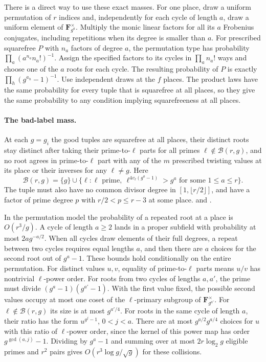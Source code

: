 There is a direct way to use these exact masses. For one place,
draw a uniform permutation of \(r\) indices and, independently for
each cycle of length \(a\), draw a uniform element of
\(\mathbf F_{g^a}^{\times}\). Multiply the monic linear factors for
all its \(a\) Frobenius conjugates, including repetitions when its
degree is smaller than \(a\). For prescribed squarefree \(P\) with
\(n_a\) factors of degree \(a\), the permutation type has probability
\(\prod_a (a^{n_a}n_a!)^{-1}\). Assign the specified factors to its
cycles in \(\prod_a n_a!\) ways and choose one of the \(a\) roots for
each cycle. The resulting probability of \(P\) is exactly
\(\prod_h(g^{a_h}-1)^{-1}\). Use independent draws at the \(f\) places.
The product laws have the same probability for every tuple that is
squarefree at all places, so they give the same probability to any
condition implying squarefreeness at all places.

\paragraph{The bad-label mass.}
At each \(g=g_i\) the good tuples are squarefree at all places,
their distinct roots stay distinct after taking their prime-to-\(\ell\)
parts for all primes \(\ell\notin\mathcal B(r,g)\), and no root
agrees in prime-to-\(\ell\) part with any of the \(m\) prescribed
twisting values at its place or their inverses for any \(\ell\ne g\).
Here
\[
 \mathcal B(r,g)=\{g\}\cup
   \{\ell:\ell\text{ prime},\ \ell^{4v_\ell(g^a-1)}>g^a
                       \text{ for some }1\le a\le r\}.
\]
The tuple must also have no common divisor degree in
\([1,\lfloor r/2\rfloor]\), and have a factor of prime degree \(p\)
with \(r/2<p\le r-3\) at some place.
and .

In the permutation model the probability of a repeated root at a
place is \(O(r^3/g)\). A cycle of length \(a\ge2\) lands in a proper
subfield with probability at most \(2a g^{-a/2}\). When all cycles
draw elements of their full degrees, a repeat between two cycles
requires equal lengths \(a\), and then there are \(a\) choices for
the second root out of \(g^a-1\). These bounds hold conditionally on
the entire permutation. For distinct values \(u,v\), equality
of prime-to-\(\ell\) parts means \(u/v\) has nontrivial \(\ell\)-power
order. For roots from two cycles of lengths \(a,a'\), the prime
must divide \((g^a-1)(g^{a'}-1)\). With the first value fixed, the
possible second values occupy at most one coset of the \(\ell\)-primary
subgroup of \(\mathbf F_{g^{a'}}^\times\). For \(\ell\notin\mathcal B(r,g)\)
its size is at most \(g^{a'/4}\). For roots in the same cycle of
length \(a\), their ratio has the form \(u^{g^j-1}\), \(0<j<a\).
There are at most \(g^{a/2}g^{a/4}\) choices for \(u\) with this ratio
of \(\ell\)-power order, since the kernel of this power map has order
\(g^{\gcd(a,j)}-1\). Dividing by \(g^a-1\) and summing over at
most \(2r\log_2 g\) eligible primes and \(r^2\) pairs gives
\(O(r^3\log g/\sqrt g)\) for these collisions.

